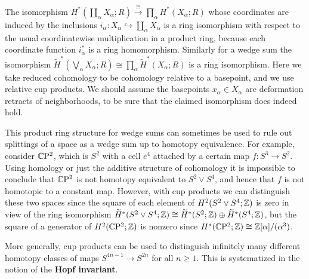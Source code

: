 \begin{example}
The isomorphism $H^*(\coprod_\alpha X_\alpha;R)\stackrel{\cong}{\longrightarrow}\prod_\alpha　H^*(X_\alpha;R)$
whose coordinates are induced by the inclusions $i_\alpha:X_\alpha\hookrightarrow\coprod_\alpha X_\alpha$ is a ring isomorphism
with respect to the usual coordinatewise multiplication in a product ring, because each coordinate function $i^*_\alpha$ is a ring homomorphism. Similarly for a wedge sum the isomorphism $\widetilde{H}^*(\bigvee_\alpha X_\alpha;R)\cong\prod_\alpha\widetilde{H}^*(X_\alpha;R)$ is a ring isomorphism. Here we take reduced cohomology to be cohomology relative to a basepoint, and we use relative cup products. We should assume the basepoints $x_\alpha\in X_\alpha$ are deformation retracts of neighborhoods, to be sure that the claimed isomorphism does indeed hold.\par
This product ring structure for wedge sums can sometimes be used to rule out
splittings of a space as a wedge sum up to homotopy equivalence. For example, consider $\mathbb{C}\mathrm{P}^2$, which is $S^2$ with a cell $e^4$ attached by a certain map $f:S^3\to S^2$. Using homology or just the additive structure of cohomology it is impossible to conclude that $\mathbb{C}\mathrm{P}^2$ is not homotopy equivalent to $S^2\vee S^4$, and hence that $f$ is not homotopic to a constant map. However, with cup products we can distinguish these two spaces since the square of each element of $H^2(S^2\vee S^4;\mathbb{Z})$ is zero in view of the ring isomorphism $\widetilde{H}^*(S^2\vee S^4;\mathbb{Z})\cong\widetilde{H}^*(S^2;\mathbb{Z})\oplus\widetilde{H}^*(S^4;\mathbb{Z})$, but the square of a generator of $H^2(\mathbb{C}\mathrm{P}^2;\mathbb{Z})$ is nonzero since $H^*(\mathbb{C}\mathrm{P}^2;\mathbb{Z})\cong \mathbb{Z}[\alpha]/(\alpha^3)$.\par
More generally, cup products can be used to distinguish infinitely many different homotopy classes of maps $S^{4n-1}\to S^{2n}$ for all $n\geq 1$. This is systematized in the notion of the \textbf{Hopf invariant}.
\end{example}
